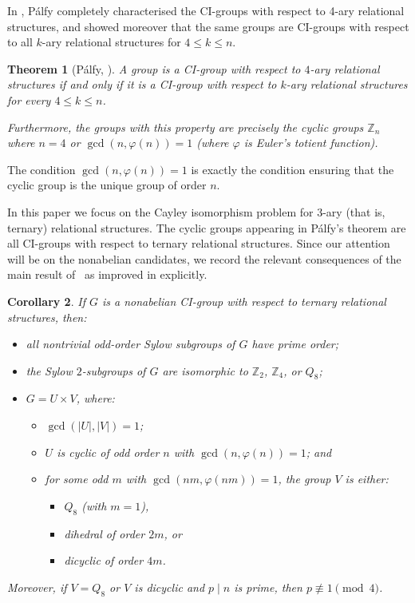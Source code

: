 \documentclass[11pt]{amsart}
\numberwithin{equation}{section}
\newtheorem{thrm}{Theorem}[section]
\newtheorem{cor}[thrm]{Corollary}
\theoremstyle{definition}
\def\Z{{\mathbb Z}}
\begin{document}
	In \cite{Palfy1987}, P\'alfy completely characterised the CI-groups with respect to 4-ary relational structures, and showed moreover that the same groups are CI-groups with respect to all $k$-ary relational structures for $4 \le k \le n$.
	
	\begin{thrm}[P\'{a}lfy, \cite{Palfy1987}]
		A group is a CI-group with respect to $4$-ary relational structures if and only if it is a CI-group with respect to $k$-ary relational structures for every $4 \le k \le n$.
		
		Furthermore, the groups with this property are precisely the cyclic groups $\Z_n$ where $n=4$ or $\gcd(n,\varphi(n))=1$ (where $\varphi$ is Euler’s totient function).
	\end{thrm}
	
	The condition $\gcd(n,\varphi(n))=1$ is exactly the condition ensuring that the cyclic group is the unique group of order $n$.
	
	In this paper we focus on the Cayley isomorphism problem for $3$-ary (that is, ternary) relational structures. The cyclic groups appearing in P\'alfy’s theorem are all CI-groups with respect to ternary relational structures. 
	Since our attention will be on the nonabelian candidates, we record the relevant consequences of the main result of~\cite{Dobson2003} as improved in \cite{DobsonS2013} explicitly.
	\begin{cor}\label{previous-nonabelian}
		If $G$ is a nonabelian CI-group with respect to ternary relational structures, then:
		\begin{itemize}
			\item all nontrivial odd-order Sylow subgroups of $G$ have prime order;
			\item the Sylow $2$-subgroups of $G$ are isomorphic to $\Z_2$, $\Z_4$, or $Q_8$;
			\item $G = U \times V$, where:
			\begin{itemize}
				\item $\gcd(|U|,|V|)=1$;
				\item $U$ is cyclic of odd order $n$ with $\gcd(n,\varphi(n))=1$; and
				\item for some odd $m$ with $\gcd(nm,\varphi(nm))=1$, the group $V$ is either:
				\begin{itemize}
					\item $Q_8$ (with $m=1$),
					\item dihedral of order $2m$, or
					\item dicyclic of order $4m$.
				\end{itemize}
			\end{itemize}
		\end{itemize}
		
		Moreover, if $V=Q_8$ or $V$ is dicyclic and $p\mid n$ is prime, then $p\not\equiv 1\pmod 4$.
	\end{cor}
	
\end{document}
